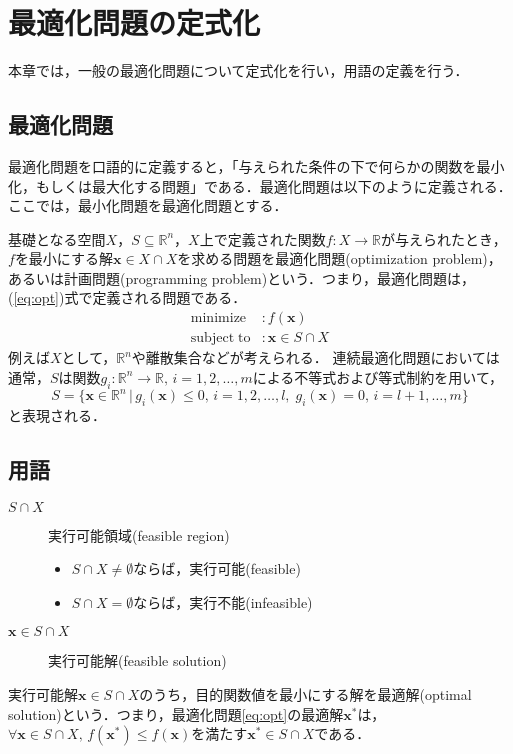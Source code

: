\documentclass{jsreport}
\begin{document}
\chapter{最適化問題の定式化}
本章では，一般の最適化問題について定式化を行い，用語の定義を行う．
\section{最適化問題}
最適化問題を口語的に定義すると，「与えられた条件の下で何らかの関数を最小化，もしくは最大化する問題」である．最適化問題は以下のように定義される．ここでは，最小化問題を最適化問題とする．

基礎となる空間$X$，$S \subseteq \mathbb{R}^n$，$X$上で定義された関数$f: X \rightarrow \mathbb{R}$が与えられたとき，$f$を最小にする解$\bm{x} \in X \cap X$を求める問題を最適化問題(optimization problem)，あるいは計画問題(programming problem)という．つまり，最適化問題は，(\ref{eq:opt})式で定義される問題である．
\begin{align}\label{eq:opt}
  \mathrm{minimize} &: f(\bm{x}) \nonumber\\
  \mathrm{subject \; to} &: \bm{x} \in S \cap X
\end{align}
例えば$X$として，$\mathbb{R}^n$や離散集合などが考えられる．
連続最適化問題においては通常，$S$は関数$g_i: \mathbb{R}^n \rightarrow \mathbb{R}, \, i = 1, 2, \ldots, m$による不等式および等式制約を用いて，
\begin{equation}\label{eq:const}
  S = \{\bm{x} \in \mathbb{R}^n \, | \, g_i(\bm{x}) \leq 0, \, i = 1, 2, \ldots, l, \; g_i(\bm{x}) = 0, \, i = l + 1, \ldots, m\}
\end{equation}
と表現される．

\section{用語}
\begin{description}
  \item[$S \cap X$] 実行可能領域(feasible region)
  \begin{itemize}
    \item $S \cap X \neq \emptyset$ならば，実行可能(feasible)
    \item $S \cap X = \emptyset$ならば，実行不能(infeasible)
  \end{itemize}
  \item[$\bm{x} \in S \cap X$] 実行可能解(feasible solution)
\end{description}

実行可能解$\bm{x} \in S \cap X$のうち，目的関数値を最小にする解を最適解(optimal solution)という．つまり，最適化問題\ref{eq:opt}の最適解$\bm{x}^*$は，$\forall \bm{x} \in S \cap X, \, f(\bm{x}^*) \leq f(\bm{x})$を満たす$\bm{x}^* \in S \cap X$である．
\end{document}
